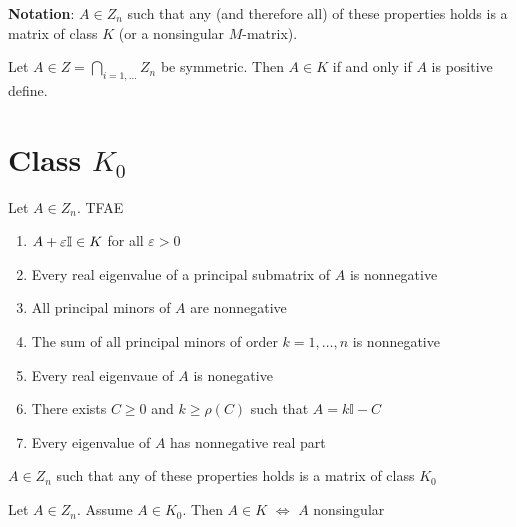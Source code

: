 \documentclass[aspectratio=169]{beamer}
\begin{document}
\begin{frame}
\textbf{Notation}: $A\in Z_n$ such that any (and therefore all) of these properties holds is a matrix of class $K$ (or a nonsingular $M$-matrix). \\
\vfill
\begin{theorem}
Let $A\in Z= \bigcap\limits_{i=1, \dots}Z_n$ be symmetric. Then $A\in K$ if and only if $A$ is positive define.
\end{theorem}
\end{frame}



\section{Class $K_0$}
\begin{frame}
\begin{theorem}
Let $A\in Z_n$. TFAE
\begin{enumerate}
    \item $A+\varepsilon \mathbb{I}\in K$ for all $\varepsilon>0$
    \item Every real eigenvalue of a principal submatrix of $A$ is nonnegative
    \item All principal minors of $A$ are nonnegative
    \item The sum of all principal minors of order $k= 1, \dots, n$ is nonnegative
    \item Every real eigenvaue of $A$ is nonegative
    \item There exists $C\geq 0$ and $k\geq \rho(C)$ such that $A= k \mathbb{I}-C$
    \item Every eigenvalue of $A$ has nonnegative real part
\end{enumerate}
$A\in Z_n$ such that any of these properties holds is a matrix of class $K_0$
\end{theorem}
\vfill
\begin{theorem}
Let $A\in Z_n$. Assume $A\in K_0$. Then $A\in K$ $\iff$ $A$ nonsingular
\end{theorem}
\end{frame}

\end{document}

